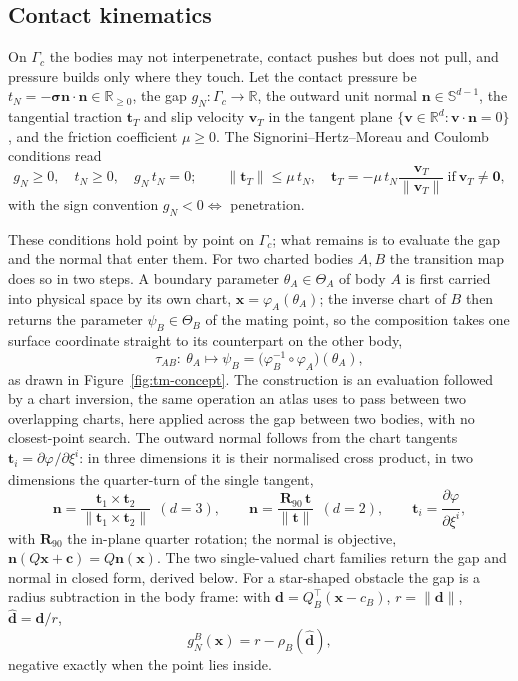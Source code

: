 \documentclass{svjour3}                 %
\newcommand{\R}{\mathbb{R}}
\newcommand{\Sph}{\mathbb{S}}
\newcommand{\norm}[1]{\lVert#1\rVert}
\newcommand{\dhat}{\hat{\bm{d}}}
\newcommand{\nbf}{\bm{n}}
\newcommand{\tbf}{\bm{t}}
\newcommand{\xbf}{\bm{x}}
\newcommand{\vbf}{\bm{v}}
\newcommand{\gn}{g_{\scriptscriptstyle N}}
\newcommand{\tmap}{\tau_{AB}}
\newcommand{\map}[1]{\varphi_{#1}}
\begin{document}
\subsection{Contact kinematics}\label{sec:tmap:kin}

On $\Gamma_c$ the bodies may not interpenetrate, contact pushes but does not pull, and pressure builds only
where they touch. Let the contact pressure be $t_N=-\bm\sigma\nbf\cdot\nbf\in\R_{\ge0}$, the gap
$\gn:\Gamma_c\to\R$, the outward unit normal $\nbf\in\Sph^{d-1}$, the tangential traction $\tbf_T$ and slip
velocity $\vbf_T$ in the tangent plane $\{\vbf\in\R^d:\vbf\cdot\nbf=0\}$, and the friction coefficient
$\mu\ge0$. The Signorini--Hertz--Moreau and Coulomb conditions read
\begin{equation}\label{eq:signorini}
\gn\ge0,\quad t_N\ge0,\quad \gn\,t_N=0;\qquad
\norm{\tbf_T}\le\mu\,t_N,\quad \tbf_T=-\mu\,t_N\frac{\vbf_T}{\norm{\vbf_T}}\ \text{if}\ \vbf_T\neq\bm0,
\end{equation}
with the sign convention $\gn<0\Leftrightarrow$ penetration.

These conditions hold point by point on $\Gamma_c$; what remains is to evaluate the gap and the normal that
enter them. For two charted bodies $A,B$ the transition map does so in two steps. A boundary parameter
$\theta_A\in\Theta_A$ of body $A$ is first carried into physical space by its own chart,
$\xbf=\map{A}(\theta_A)$; the inverse chart of $B$ then returns the parameter $\psi_B\in\Theta_B$ of the mating
point, so the composition takes one surface coordinate straight to its counterpart on the other body,
\begin{equation}\label{eq:tmap-def}
\tmap:\ \theta_A\longmapsto\psi_B=\big(\map{B}^{-1}\circ\map{A}\big)(\theta_A),
\end{equation}
as drawn in Figure~\ref{fig:tm-concept}. The construction is an evaluation followed by a chart inversion, the
same operation an atlas uses to pass between two overlapping charts, here applied across the gap between two
bodies, with no closest-point search. The outward normal follows from the chart tangents
$\tbf_i=\partial\map{}/\partial\xi^i$: in three dimensions it is their normalised cross product, in two
dimensions the quarter-turn of the single tangent,
\begin{equation}\label{eq:jacobian-normal}
\nbf=\frac{\tbf_1\times\tbf_2}{\norm{\tbf_1\times\tbf_2}}\ \ (d{=}3),\qquad
\nbf=\frac{\bm R_{90}\,\tbf}{\norm{\tbf}}\ \ (d{=}2),\qquad
\tbf_i=\frac{\partial\map{}}{\partial\xi^i},
\end{equation}
with $\bm R_{90}$ the in-plane quarter rotation; the normal is objective, $\nbf(Q\xbf+\bm c)=Q\nbf(\xbf)$. The
two single-valued chart families return the gap and normal in closed form, derived below. For a star-shaped
obstacle the gap is a radius subtraction in the body frame: with $\bm d=Q_B^\top(\xbf-c_B)$, $r=\norm{\bm d}$,
$\dhat=\bm d/r$,
\begin{equation}\label{eq:radial-gap}
\gn^B(\xbf)=r-\rho_B(\dhat) ,
\end{equation}
negative exactly when the point lies inside.
\end{document}
